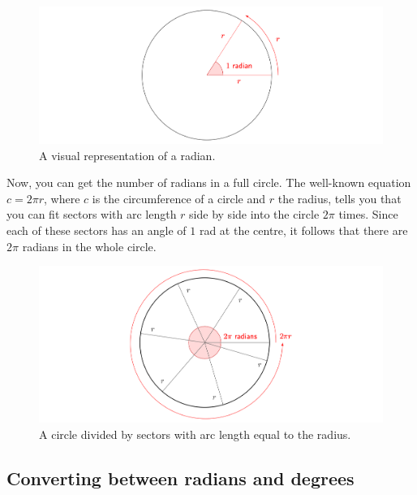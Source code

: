 \documentclass[
  12pt,
  a4paper, oneside]{starmastarticle}
\begin{document}
\begin{figure}

{\centering \includegraphics[width=1.5\textwidth,height=\textheight]{./FiguresPNG/radians-radian.png}

}

\caption{A visual representation of a radian.}

\end{figure}

Now, you can get the number of radians in a full circle. The well-known
equation \(c = 2 \pi r\), where \(c\) is the circumference of a circle
and \(r\) the radius, tells you that you can fit sectors with arc length
\(r\) side by side into the circle \(2\pi\) times. Since each of these
sectors has an angle of \(1\) rad at the centre, it follows that there
are \(2\pi\) radians in the whole circle.

\begin{figure}

{\centering \includegraphics[width=1.5\textwidth,height=\textheight]{./FiguresPNG/radians-circle-divided.png}

}

\caption{A circle divided by sectors with arc length equal to the
radius.}

\end{figure}

\hypertarget{converting-between-radians-and-degrees}{%
\subsection{Converting between radians and
degrees}\label{converting-between-radians-and-degrees}}
\end{document}
